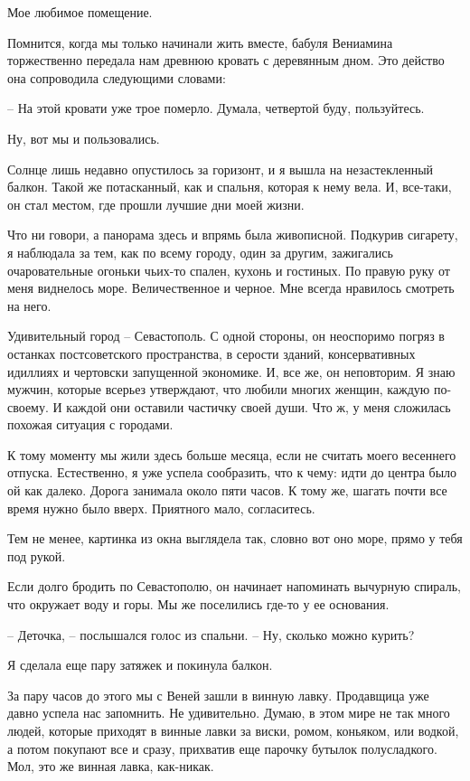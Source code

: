 \documentclass[
]{book}
\begin{document}
Мое любимое помещение.

Помнится, когда мы только начинали жить вместе, бабуля Вениамина торжественно передала нам древнюю кровать с деревянным дном. Это действо она сопроводила следующими словами:

-- На этой кровати уже трое померло. Думала, четвертой буду, пользуйтесь.

Ну, вот мы и пользовались.

Солнце лишь недавно опустилось за горизонт, и я вышла на незастекленный балкон. Такой же потасканный, как и спальня, которая к нему вела. И, все-таки, он стал местом, где прошли лучшие дни моей жизни.

Что ни говори, а панорама здесь и впрямь была живописной. Подкурив сигарету, я наблюдала за тем, как по всему городу, один за другим, зажигались очаровательные огоньки чьих-то спален, кухонь и гостиных. По правую руку от меня виднелось море. Величественное и черное. Мне всегда нравилось смотреть на него.

Удивительный город -- Севастополь. С одной стороны, он неоспоримо погряз в останках постсоветского пространства, в серости зданий, консервативных идиллиях и чертовски запущенной экономике. И, все же, он неповторим. Я знаю мужчин, которые всерьез утверждают, что любили многих женщин, каждую по-своему. И каждой они оставили частичку своей души. Что ж, у меня сложилась похожая ситуация с городами.

К тому моменту мы жили здесь больше месяца, если не считать моего весеннего отпуска. Естественно, я уже успела сообразить, что к чему: идти до центра было ой как далеко. Дорога занимала около пяти часов. К тому же, шагать почти все время нужно было вверх. Приятного мало, согласитесь.

Тем не менее, картинка из окна выглядела так, словно вот оно море, прямо у тебя под рукой.

Если долго бродить по Севастополю, он начинает напоминать вычурную спираль, что окружает воду и горы. Мы же поселились где-то у ее основания.

-- Деточка, -- послышался голос из спальни. -- Ну, сколько можно курить?

Я сделала еще пару затяжек и покинула балкон.

За пару часов до этого мы с Веней зашли в винную лавку. Продавщица уже давно успела нас запомнить. Не удивительно. Думаю, в этом мире не так много людей, которые приходят в винные лавки за виски, ромом, коньяком, или водкой, а потом покупают все и сразу, прихватив еще парочку бутылок полусладкого. Мол, это же винная лавка, как-никак.
\end{document}
